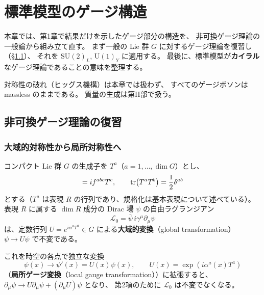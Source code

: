 \documentclass[uplatex,dvipdfmx,a4paper,11pt,openany]{jsbook}
\newcommand{\term}[2]{\textbf{#1}（#2）}
\numberwithin{equation}{chapter}
\theoremstyle{definition}
\theoremstyle{plain}
\theoremstyle{remark}
\newcommand{\Lag}{\mathcal{L}}
\newcommand{\SU}{\mathrm{SU}}
\newcommand{\U}{\mathrm{U}}
\begin{document}
\chapter{標準模型のゲージ構造}
本章では、第1章で結果だけを示したゲージ部分の構造を、
非可換ゲージ理論の一般論から組み立て直す。
まず一般の Lie 群 $G$ に対するゲージ理論を復習し（\S\ref{sec:YM-review}）、
それを $\SU(2)_L$, $\U(1)_Y$ に適用する。
最後に、標準模型が\textbf{カイラル}なゲージ理論であることの意味を整理する。

対称性の破れ（ヒッグス機構）は本章では扱わず、
すべてのゲージボソンは massless のままである。
質量の生成は第II部で扱う。
\section{非可換ゲージ理論の復習}
\label{sec:YM-review}
\subsection{大域的対称性から局所対称性へ}
コンパクト Lie 群 $G$ の生成子を $T^a$（$a=1,\dots,\dim G$）とし、
\begin{equation}
[T^a,T^b]=if^{abc}T^c,
\qquad
\tr(T^aT^b)=\frac12\delta^{ab}
\end{equation}
とする（$T^a$ は表現 $R$ の行列であり、規格化は基本表現について述べている）。
表現 $R$ に属する $\dim R$ 成分の Dirac 場 $\psi$ の自由ラグランジアン
\begin{equation}
\Lag_0=\bar\psi\,i\gamma^\mu\partial_\mu\psi
\end{equation}
は、定数行列 $U=e^{i\alpha^aT^a}\in G$ による\term{大域的変換}{global transformation}
$\psi\to U\psi$ で不変である。

これを時空の各点で独立な変換
\begin{equation}
\psi(x)\longrightarrow\psi'(x)=U(x)\psi(x),
\qquad
U(x)=\exp\left(i\alpha^a(x)T^a\right)
\label{eq:local-transf}
\end{equation}
（\term{局所ゲージ変換}{local gauge transformation}）に拡張すると、
$\partial_\mu\psi\to U\partial_\mu\psi+(\partial_\mu U)\psi$ となり、
第2項のために $\Lag_0$ は不変でなくなる。
\end{document}
